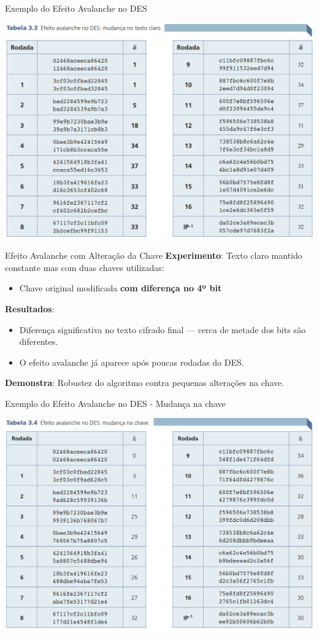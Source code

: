 \begin{frame}{Exemplo do Efeito Avalanche no DES}


    \centering
    \includegraphics[width=0.7\linewidth]{Figuras/des-efeito-avalanche.png}

\end{frame}

\begin{frame}{Efeito Avalanche com Alteração da Chave}
    \textbf{Experimento}: Texto claro mantido constante mas com duas chaves utilizadas:
    \begin{itemize}
        \item Chave original modificada \textbf{com diferença no 4º bit}
    \end{itemize}
    \textbf{Resultados}:
    \begin{itemize}
        \item Diferença significativa no texto cifrado final — cerca de metade dos bits são diferentes.
        \item O efeito avalanche já aparece após poucas rodadas do DES.
    \end{itemize}
    \textbf{Demonstra}: Robustez do algoritmo contra pequenas alterações na chave.

\end{frame}

\begin{frame}{Exemplo do Efeito Avalanche no DES - Mudança na chave}


    \centering
    \includegraphics[width=0.7\linewidth]{Figuras/des-efeito-avalanche-chave.png}

\end{frame}

